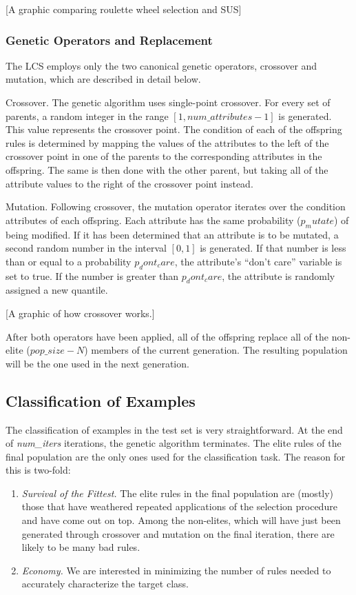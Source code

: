 \documentclass[11pt]{article}
\begin{document}
[A graphic comparing roulette wheel selection and SUS]

\subsubsection*{Genetic Operators and Replacement}

The LCS employs only the two canonical genetic operators, crossover and mutation, which are described in detail below.

Crossover. The genetic algorithm uses single-point crossover. For every set of parents, a random integer in the range $[1, num\_attributes - 1]$ is generated. This value represents the crossover point. The condition of each of the offspring rules is determined by mapping the values of the attributes to the left of the crossover point in one of the parents to the corresponding attributes in the offspring. The same is then done with the other parent, but taking all of the attribute values to the right of the crossover point instead.

Mutation. Following crossover, the mutation operator iterates over the condition attributes of each offspring. Each attribute has the same probability ($p_mutate$) of being modified. If it has been determined that an attribute is to be mutated, a second random number in the interval $[0,1]$ is generated. If that number is less than or equal to a probability $p_dont_care$, the attribute’s ``don’t care'' variable is set to true. If the number is greater than $p_dont_care$, the attribute is randomly assigned a new quantile.

[A graphic of how crossover works.]

After both operators have been applied, all of the offspring replace all of the non-elite ($pop\_size - N$) members of the current generation. The resulting population will be the one used in the next generation.
\subsection{Classification of Examples}
The classification of examples in the test set is very straightforward. At the end of \textit{num\_iters} iterations, the genetic algorithm terminates. The elite rules of the final population are the only ones used for the classification task. The reason for this is two-fold:
\begin{enumerate}
\item \textit{Survival of the Fittest.} The elite rules in the final population are (mostly) those that have weathered repeated applications of the selection procedure and have come out on top. Among the non-elites, which will have just been generated through crossover and mutation on the final iteration, there are likely to be many bad rules.
\item \textit{Economy.} We are interested in minimizing the number of rules needed to accurately characterize the target class.
\end{enumerate}
\end{document}
